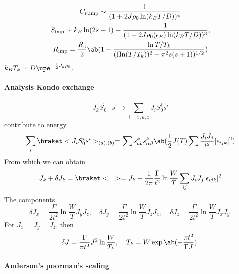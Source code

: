 \begin{center}
\end{center}
\begin{gather}
  C_{\nu,\text{imp}} \sim \frac{1}{(1 + 2J\rho_0\ln(k_BT/D))^4}\\
  S_\text{imp} \sim k_B\ln(2s + 1)
    - \frac1{(1 + 2J\rho_0(\epsilon_F)\ln(k_BT/D))^3},\\
  R_\text{imp} = \frac{R_c}{2}
    \ab(1 - \frac{\ln T/T_k}{((\ln(T/T_k))^2 + \pi^2 s(s + 1))^{1/2}})
\end{gather}
$k_BT_k \sim D\upe^{-\frac12 J_k\rho_0}$.

\paragraph{Analysis Kondo exchange}

\[
  J_k \vec S_0 \cdot \vec s \to \sum_{i = x,u,z} J_i S_0^i s^i
\]
contribute to energy
\begin{equation}
  \sum_i \braket<J_i S_0^i s^i>_{(a),(b)}
= \sum s_{ab}^k s_{\alpha\beta}^k
  \ab(\frac12 J(T) \sum\frac{J_iJ_j}{t^2} |\epsilon_{ijk}|^2)
\end{equation}
From which we can obtain
\[
  J_k + \delta J_k = \braket<\quad>
= J_k + \frac1{2\pi} \frac\Gamma{t^2} \ln \frac WT \sum_{ij} J_i J_j
  |\epsilon_{ijk}|^2
\]
The components
\[
  \delta J_x = \frac{\Gamma}{2t^2}\ln\frac WT J_yJ_z,\quad
  \delta J_y = \frac{\Gamma}{2t^2}\ln\frac WT J_zJ_x,\quad
  \delta J_z = \frac{\Gamma}{2t^2}\ln\frac WT J_xJ_y.
\]
For $J_x = J_y = J_z$, then
\[
  \delta J = \frac{\Gamma}{\pi t^2} J^2 \ln \frac W{T_k}, \quad
  T_k = W\exp\ab(-\frac{\pi t^2}{\Gamma J}).
\]
\paragraph{Anderson's poorman's scaling}

